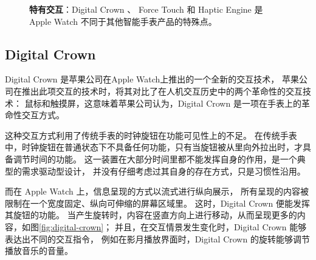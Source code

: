 \begin{figure}[H]
    \kaishu
    \centering
    \caption{\textbf{特有交互}：Digital Crown 、 Force Touch 和 Haptic Engine 是 Apple Watch 不同于其他智能手表产品的特殊点。}
    \label{fig:special}
\end{figure}

\subsection{Digital Crown}

Digital Crown 是苹果公司在Apple Watch上推出的一个全新的交互技术，
苹果公司在推出此项交互的技术时，将其对比了在人机交互历史中的两个革命性的交互技术：
鼠标和触摸屏，这意味着苹果公司认为，Digital Crown 是一项在手表上的革命性交互方式。

这种交互方式利用了传统手表的时钟旋钮在功能可见性上的不足。
在传统手表中，时钟旋钮在普通状态下不具备任何功能，只有当旋钮被从里向外拉出时，才具备调节时间的功能。
这一装置在大部分时间里都不能发挥自身的作用，是一个典型的需求驱动型设计，
并没有仔细考虑过其自身的存在方式，只是习惯性沿用。

而在 Apple Watch 上，信息呈现的方式以流式进行纵向展示，
所有呈现的内容被限制在一个宽度固定、纵向可伸缩的屏幕区域里。
这时，Digital Crown 便能发挥其旋钮的功能。
当产生旋转时，内容在竖直方向上进行移动，从而呈现更多的内容，如图\ref{fig:digital-crown}；
并且，在交互情景发生变化时，Digital Crown 能够表达出不同的交互指令，
例如在影月播放界面时，Digital Crown 的旋转能够调节播放音乐的音量。

